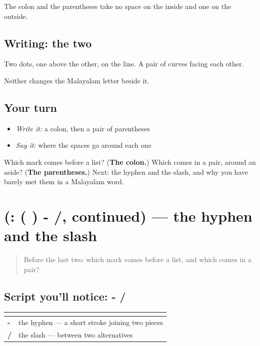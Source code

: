 The colon and the parentheses take no space on the inside and one on the outside.

\subsection*{Writing: the two}
Two dots, one above the other, on the line. A pair of curves facing each other.

Neither changes the Malayalam letter beside it.

\subsection*{Your turn}
\begin{itemize}
\raggedright
  \item \emph{Write it:} a colon, then a pair of parentheses
  \item \emph{Say it:} where the spaces go around each one
\end{itemize}

\begin{tcolorbox}[breakable,colback=teal!4,colframe=teal!35!black,title={Before you move on}]
Which mark comes before a list? (\textbf{The colon.}) Which comes in a pair, around an aside? (\textbf{The parentheses.}) Next: the hyphen and the slash, and why you have barely met them in a Malayalam word.
\end{tcolorbox}
\section[(: ( ) - /, continued)]{(: ( ) - /, continued) — the hyphen and the slash}

\label{lesson:ML-W108-the-rest-more}



\begin{quote}
Before the last two: which mark comes before a list, and which comes in a pair?
\end{quote}

\subsection*{Script you'll notice: - /}
\noindent
\begin{tabularx}{\linewidth}{@{}>{\raggedright\arraybackslash}X>{\raggedright\arraybackslash}X@{}}
\toprule
\textbf{} & \textbf{} \\
\midrule
\textbf{-} & the hyphen — a short stroke joining two pieces \\
\textbf{/} & the slash — between two alternatives \\
\bottomrule
\end{tabularx}

